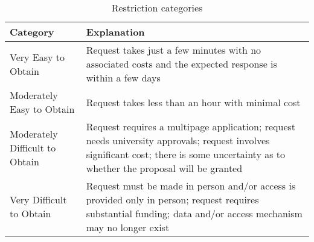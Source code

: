 \begin{table}[h]
\centering
\caption{Restriction categories} 
\label{tab:categories}
\begin{tabular}{lp{4in}}
  \toprule
Category & Explanation \\ 
  \midrule
Very Easy to Obtain & Request takes just a few minutes with no associated costs and the expected response is within a few days \\ 
  Moderately Easy to Obtain & Request takes less than an hour with minimal cost \\ 
  Moderately Difficult to Obtain & Request requires a multipage application; request needs university approvals; request involves significant cost; there is some uncertainty as to whether the proposal will be granted \\ 
  Very Difficult to Obtain & Request must be made in person and/or access is provided only in person; request requires substantial funding; data and/or access mechanism may no longer exist \\ 
   \bottomrule
\end{tabular}
\end{table}
